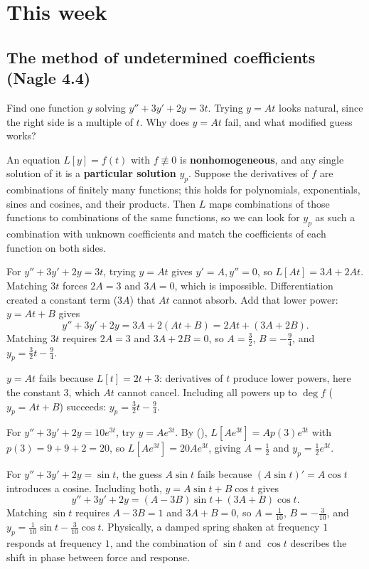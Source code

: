 \documentclass[10pt]{scrartcl}
\begin{document}
\section{This week}
\subsection{The method of undetermined coefficients (Nagle 4.4)}
\begin{qbox}
  Find one function $y$ solving $y''+3y'+2y=3t$. Trying $y=At$ looks natural, since the right side is a multiple of $t$. Why does $y=At$ fail, and what modified guess works?
\end{qbox}

An equation $L[y]=f(t)$ with $f\not\equiv 0$ is \textbf{nonhomogeneous}, and any single solution of it is a \textbf{particular solution} $y_p$. Suppose the derivatives of $f$ are combinations of finitely many functions; this holds for polynomials, exponentials, sines and cosines, and their products. Then $L$ maps combinations of those functions to combinations of the same functions, so we can look for $y_p$ as such a combination with unknown coefficients and match the coefficients of each function on both sides.

\begin{example*}
  For $y''+3y'+2y=3t$, trying $y=At$ gives $y'=A, y''=0$, so $L[At]=3A+2At$. Matching $3t$ forces $2A=3$ and $3A=0$, which is impossible. Differentiation created a constant term ($3A$) that $At$ cannot absorb. Add that lower power: $y=At+B$ gives
  \[
    y''+3y'+2y = 3A + 2(At+B) = 2At + (3A+2B).
  \]
  Matching $3t$ requires $2A=3$ and $3A+2B=0$, so $A=\frac32$, $B=-\frac94$, and $y_p=\frac32 t-\frac94$.
\end{example*}

\revisit $y=At$ fails because $L[t]=2t+3$: derivatives of $t$ produce lower powers, here the constant $3$, which $At$ cannot cancel. Including all powers up to $\deg f$ ($y_p=At+B$) succeeds: $y_p=\frac32 t-\frac94$.

\begin{example*}
  For $y''+3y'+2y=10e^{3t}$, try $y=Ae^{3t}$. By (), $L[Ae^{3t}]=Ap(3)e^{3t}$ with $p(3)=9+9+2=20$, so $L[Ae^{3t}]=20Ae^{3t}$, giving $A=\frac12$ and $y_p=\frac12 e^{3t}$.
\end{example*}

\begin{example*}
  For $y''+3y'+2y=\sin t$, the guess $A\sin t$ fails because $(A\sin t)'=A\cos t$ introduces a cosine. Including both, $y=A\sin t+B\cos t$ gives
  \[
    y''+3y'+2y = (A-3B)\sin t + (3A+B)\cos t.
  \]
  Matching $\sin t$ requires $A-3B=1$ and $3A+B=0$, so $A=\frac{1}{10}$, $B=-\frac{3}{10}$, and $y_p=\frac{1}{10}\sin t-\frac{3}{10}\cos t$. Physically, a damped spring shaken at frequency $1$ responds at frequency $1$, and the combination of $\sin t$ and $\cos t$ describes the shift in phase between force and response.
\end{example*}
\end{document}
